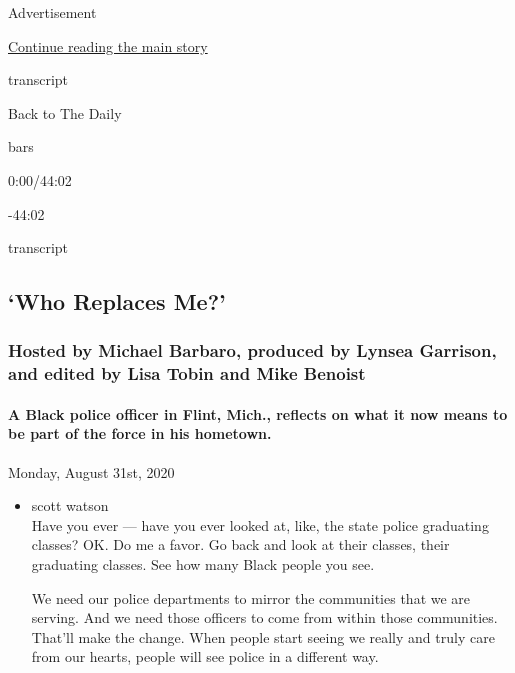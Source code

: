 Advertisement

\protect\hyperlink{after-top}{Continue reading the main story}

transcript

Back to The Daily

bars

0:00/44:02

-44:02

transcript

\hypertarget{who-replaces-me}{%
\subsection{`Who Replaces Me?'}\label{who-replaces-me}}

\hypertarget{hosted-by-michael-barbaro-produced-by-lynsea-garrison-and-edited-by-lisa-tobin-and-mike-benoist}{%
\subsubsection{Hosted by Michael Barbaro, produced by Lynsea Garrison,
and edited by Lisa Tobin and Mike
Benoist}\label{hosted-by-michael-barbaro-produced-by-lynsea-garrison-and-edited-by-lisa-tobin-and-mike-benoist}}

\hypertarget{a-black-police-officer-in-flint-mich-reflects-on-what-it-now-means-to-be-part-of-the-force-in-his-hometown}{%
\paragraph{A Black police officer in Flint, Mich., reflects on what it
now means to be part of the force in his
hometown.}\label{a-black-police-officer-in-flint-mich-reflects-on-what-it-now-means-to-be-part-of-the-force-in-his-hometown}}

Monday, August 31st, 2020

\begin{itemize}
\item
  scott watson\\
  Have you ever --- have you ever looked at, like, the state police
  graduating classes? OK. Do me a favor. Go back and look at their
  classes, their graduating classes. See how many Black people you see.

  We need our police departments to mirror the communities that we are
  serving. And we need those officers to come from within those
  communities. That'll make the change. When people start seeing we
  really and truly care from our hearts, people will see police in a
  different way.
\end{itemize}

